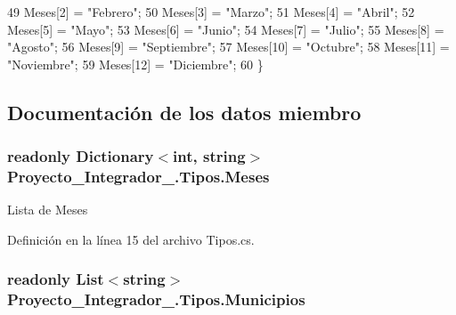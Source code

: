 \begin{DoxyCode}
49             Meses[2] = \textcolor{stringliteral}{"Febrero"};
50             Meses[3] = \textcolor{stringliteral}{"Marzo"};
51             Meses[4] = \textcolor{stringliteral}{"Abril"};
52             Meses[5] = \textcolor{stringliteral}{"Mayo"};
53             Meses[6] = \textcolor{stringliteral}{"Junio"};
54             Meses[7] = \textcolor{stringliteral}{"Julio"};
55             Meses[8] = \textcolor{stringliteral}{"Agosto"};
56             Meses[9] = \textcolor{stringliteral}{"Septiembre"};
57             Meses[10] = \textcolor{stringliteral}{"Octubre"};
58             Meses[11] = \textcolor{stringliteral}{"Noviembre"};
59             Meses[12] = \textcolor{stringliteral}{"Diciembre"};
60         \}
\end{DoxyCode}


\subsection{Documentación de los datos miembro}
\hypertarget{class_proyecto___integrador__3_1_1_tipos_a5c5105231581a49b0914b197f4aed005}{
\subsubsection[{Meses}]{\setlength{\rightskip}{0pt plus 5cm}readonly Dictionary$<$int, string$>$ Proyecto\-\_\-\-Integrador\-\_.\-Tipos.\-Meses\hspace{0.3cm}{\ttfamily [static]}}}\label{class_proyecto___integrador__3_1_1_tipos_a5c5105231581a49b0914b197f4aed005}


Lista de Meses 



Definición en la línea 15 del archivo Tipos.\-cs.

\hypertarget{class_proyecto___integrador__3_1_1_tipos_a950165b224eba3af8ee67d0b344f0704}{
\subsubsection[{Municipios}]{\setlength{\rightskip}{0pt plus 5cm}readonly List$<$string$>$ Proyecto\-\_\-\-Integrador\-\_.\-Tipos.\-Municipios\hspace{0.3cm}{\ttfamily [static]}}}\label{class_proyecto___integrador__3_1_1_tipos_a950165b224eba3af8ee67d0b344f0704}


